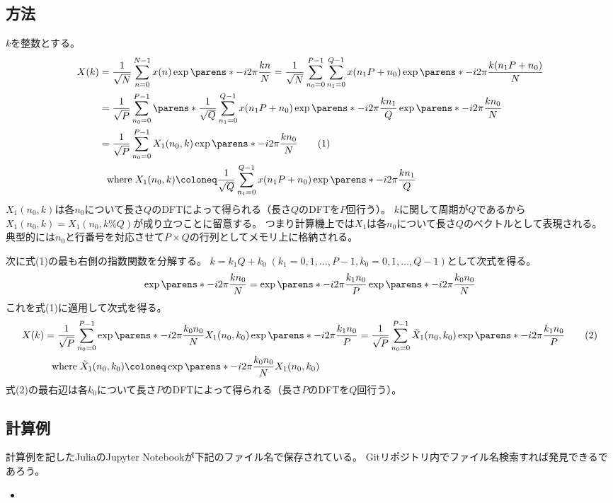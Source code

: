         \subsection{方法}
            $k$を整数とする。
            \begin{align*}
                X(k) &= \frac{1}{\sqrt{N}}\sum_{n=0}^{N-1}x(n)\exp\parens*{-i2\pi\frac{k n}{N}} = \frac{1}{\sqrt{N}}\sum_{n_0=0}^{P-1}\sum_{n_1=0}^{Q-1}x(n_1 P+n_0)\exp\parens*{-i2\pi\frac{k(n_1 P+n_0)}{N}} \\
                &= \frac{1}{\sqrt{P}}\sum_{n_0=0}^{P-1}\parens*{\frac{1}{\sqrt{Q}}\sum_{n_1=0}^{Q-1}x(n_1 P+n_0)\exp\parens*{-i2\pi\frac{k n_1}{Q}}}\exp\parens*{-i2\pi\frac{k n_0}{N}} \\
                &= \frac{1}{\sqrt{P}}\sum_{n_0=0}^{P-1}X_1(n_0,k)\exp\parens*{-i2\pi\frac{k n_0}{N}} \tag{1} \\
                &\phantom{=}\text{where}\;X_1(n_0,k)\coloneq\frac{1}{\sqrt{Q}}\sum_{n_1=0}^{Q-1}x(n_1 P+n_0)\exp\parens*{-i2\pi\frac{k n_1}{Q}}
            \end{align*}
            $X_1(n_0,k)$は各$n_0$について長さ$Q$のDFTによって得られる（長さ$Q$のDFTを$P$回行う）。
            $k$に関して周期が$Q$であるから$X_1(n_0,k) = X_1(n_0,k\%Q)$が成り立つことに留意する。
            つまり計算機上では$X_1$は各$n_0$について長さ$Q$のベクトルとして表現される。
            典型的には$n_0$と行番号を対応させて$P\times Q$の行列としてメモリ上に格納される。
            \par
            次に式(1)の最も右側の指数関数を分解する。
            $k = k_1 Q + k_0\;(k_1=0,1,\dots,P-1,k_0=0,1,\dots,Q-1)$として次式を得る。
            \[ \exp\parens*{-i2\pi\frac{k n_0}{N}} = \exp\parens*{-i2\pi\frac{k_1 n_0}{P}}\exp\parens*{-i2\pi\frac{k_0 n_0}{N}} \]
            これを式(1)に適用して次式を得る。
            \begin{align*}
                X(k) &= \frac{1}{\sqrt{P}}\sum_{n_0=0}^{P-1}\exp\parens*{-i2\pi\frac{k_0 n_0}{N}}X_1(n_0,k_0)\exp\parens*{-i2\pi\frac{k_1 n_0}{P}} = \frac{1}{\sqrt{P}}\sum_{n_0=0}^{P-1}\tilde{X}_1(n_0,k_0)\exp\parens*{-i2\pi\frac{k_1 n_0}{P}} \tag{2} \\
                &\phantom{=}\text{where}\;\tilde{X}_1(n_0,k_0)\coloneq\exp\parens*{-i2\pi\frac{k_0 n_0}{N}}X_1(n_0,k_0)
            \end{align*}
            式(2)の最右辺は各$k_0$について長さ$P$のDFTによって得られる（長さ$P$のDFTを$Q$回行う）。
        \subsection{計算例}
            計算例を記したJuliaのJupyter Notebookが下記のファイル名で保存されている。
            Gitリポジトリ内でファイル名検索すれば発見できるであろう。
            \begin{itemize}
                \item \href{\currfiledir/DFT_len_fact_expr.ipynb}{}
            \end{itemize}
